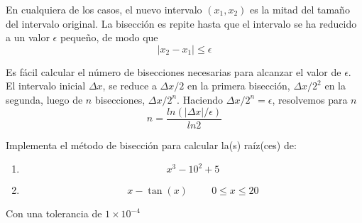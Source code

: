 \documentclass[12pt]{beamer}
\begin{document}
\begin{frame}
En cualquiera de los casos, el nuevo intervalo $(x_{1}, x_{2})$ es la mitad del tamaño del intervalo original. La bisecci\'{o}n es repite hasta que el intervalo se ha reducido a un valor $\epsilon$ pequeño, de modo que
\[ \vert x_{2} - x_{1} \vert \leq \epsilon\]
\end{frame}
\begin{frame}
Es f\'{a}cil calcular el n\'{u}mero de bisecciones necesarias para alcanzar el valor de $\epsilon$. El intervalo inicial $\Delta x$, se reduce a $\Delta x /2$ en la primera bisecci\'{o}n, $\Delta x /2^{2}$ en la segunda, luego de $n$ bisecciones, $\Delta x /2^{n}$. Haciendo $\Delta x /2^{n} = \epsilon$, resolvemos para $n$
\[ n = \dfrac{ln(\vert \Delta x \vert/ \epsilon)}{ln 2}\]
\end{frame}
\begin{frame}
Implementa el m\'{e}todo de bisecci\'{o}n para calcular la(s) ra\'{i}z(ces) de:
\begin{enumerate}
	\item \[ x^{3} - 10^{2} + 5\]
	\item \[  x- \tan(x) \hspace{1cm} 0 \leq x \leq 20\]
\end{enumerate}
Con una tolerancia de $1\times 10^{-4}$
\end{frame}
\end{document}
